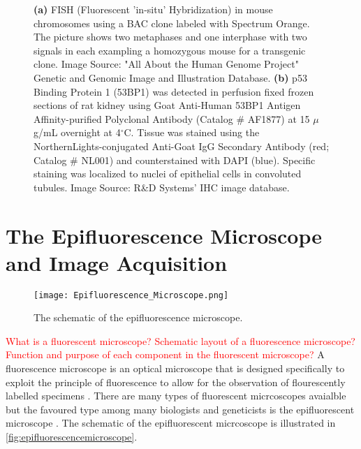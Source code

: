 \begin{figure}[!t]
	\centering
	\caption{\textbf{(a)} FISH (Fluorescent 'in-situ' Hybridization) in mouse chromosomes using a BAC clone labeled with Spectrum Orange. The picture shows two metaphases and one interphase with two signals in each exampling a homozygous mouse for a transgenic clone. Image Source: "All About the Human Genome Project" Genetic and Genomic Image and Illustration Database. %
	\textbf{(b)} p53 Binding Protein 1 (53BP1) was detected in perfusion fixed frozen sections of rat kidney using Goat Anti-Human 53BP1 Antigen Affinity-purified Polyclonal Antibody (Catalog \# AF1877) at 15 $\mu$g/mL overnight at 4$^{\circ}$C. Tissue was stained using the NorthernLights-conjugated Anti-Goat IgG Secondary Antibody (red; Catalog \# NL001) and counterstained with DAPI (blue). Specific staining was localized to nuclei of epithelial cells in convoluted tubules. Image Source: R\&D Systems' IHC image database.}
	\label{fig:stainingtechniques}
\end{figure}


\section{The Epifluorescence Microscope and Image Acquisition}
\label{sec:TheEpifluorescenceMicroscope}

\begin{figure}[!t]
	\centering
	\texttt{[image: Epifluorescence\_Microscope.png]}
	\caption{The schematic of the epifluorescence microscope.}
	\label{fig:epifluorescencemicroscope}
\end{figure}

\textcolor{red}{What is a fluorescent microscope? Schematic layout of a fluorescence microscope? Function and purpose of each component in the fluorescent microscope?}
A fluorescence microscope is an optical microscope that is designed specifically to exploit the principle of fluorescence to allow for the observation of flourescently labelled specimens \citep{Hubeny2008,Sarder2006,Dobrucki2013,Andrews2002,Fatima2008}.
There are many types of fluorescent micrcoscopes avaialble but the favoured type among many biologists and geneticists is the epifluorescent microscope \citep{Rice2016,AbramowitzDavidson2016}.
The schematic of the epifluorescent micrcoscope is illustrated in \autoref{fig:epifluorescencemicroscope}.

